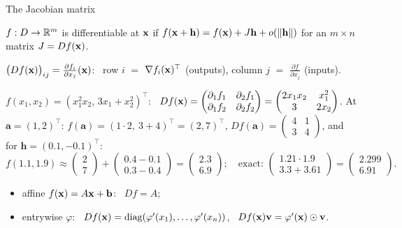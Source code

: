 \documentclass[aspectratio=1610,11pt]{beamer}
\begin{document}
\begin{frame}{The Jacobian matrix}
    \begin{definition}
        \small $f: D \to \mathbb{R}^m$ is differentiable at $\mathbf{x}$ if $f(\mathbf{x} + \mathbf{h}) = f(\mathbf{x}) + J\mathbf{h} + o(\lVert \mathbf{h} \rVert)$ for an $m \times n$ matrix $J = Df(\mathbf{x})$.
    \end{definition}
    \begin{proposition}
        \small $\big(Df(\mathbf{x})\big)_{ij} = \frac{\partial f_i}{\partial x_j}(\mathbf{x})$: \ row $i$ $=$ $\nabla f_i(\mathbf{x})^\top$ (outputs), column $j$ $=$ $\frac{\partial f}{\partial x_j}$ (inputs).
    \end{proposition}
    \small
    \begin{example}[][ex:jacobian]
        $f(x_1, x_2) = (x_1^2x_2, \, 3x_1 + x_2^2)^\top$: \ $Df(\mathbf{x}) = \begin{pmatrix} \partial_1f_1 & \partial_2f_1 \\ \partial_1f_2 & \partial_2f_2 \end{pmatrix} = \begin{pmatrix} 2x_1x_2 & x_1^2 \\ 3 & 2x_2 \end{pmatrix}$. At $\mathbf{a} = (1, 2)^\top$: $f(\mathbf{a}) = (1 \cdot 2,\ 3 + 4)^\top = (2, 7)^\top$, $Df(\mathbf{a}) = \begin{pmatrix} 4 & 1 \\ 3 & 4 \end{pmatrix}$, and for $\mathbf{h} = (0.1, -0.1)^\top$:
        \[f(1.1, 1.9) \approx \begin{pmatrix} 2 \\ 7 \end{pmatrix} + \begin{pmatrix} 0.4 - 0.1 \\ 0.3 - 0.4 \end{pmatrix} = \begin{pmatrix} 2.3 \\ 6.9 \end{pmatrix}; \quad \text{exact: } \begin{pmatrix} 1.21 \cdot 1.9 \\ 3.3 + 3.61 \end{pmatrix} = \begin{pmatrix} 2.299 \\ 6.91 \end{pmatrix}.\]
    \end{example}
    \begin{itemize}
        \item affine $f(\mathbf{x}) = A\mathbf{x} + \mathbf{b}$: \ $Df = A$;
        \item entrywise $\varphi$: \ $Df(\mathbf{x}) = \operatorname{diag}(\varphi'(x_1), \ldots, \varphi'(x_n))$, \ $Df(\mathbf{x})\mathbf{v} = \varphi'(\mathbf{x}) \odot \mathbf{v}$.
    \end{itemize}
\end{frame}
\end{document}

